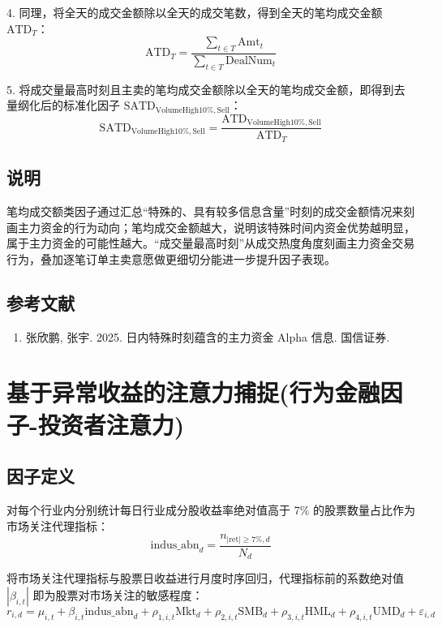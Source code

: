 \documentclass{article}
\begin{document}
4. 同理，将全天的成交金额除以全天的成交笔数，得到全天的笔均成交金额 \( \mathrm{ATD}_T \)：
\begin{equation}
    \mathrm{ATD}_T = \frac{\sum_{t \in T} \mathrm{Amt}_t}{\sum_{t \in T} \mathrm{DealNum}_t}
\end{equation}

5. 将成交量最高时刻且主卖的笔均成交金额除以全天的笔均成交金额，即得到去量纲化后的标准化因子 \( \mathrm{SATD}_{\mathrm{VolumeHigh10\%,Sell}} \)：
\begin{equation}
    \mathrm{SATD}_{\mathrm{VolumeHigh10\%,Sell}} = \frac{\mathrm{ATD}_{\mathrm{VolumeHigh10\%,Sell}}}{\mathrm{ATD}_T}
\end{equation}

\subsection{说明}
笔均成交额类因子通过汇总“特殊的、具有较多信息含量”时刻的成交金额情况来刻画主力资金的行为动向；笔均成交金额越大，说明该特殊时间内资金优势越明显，属于主力资金的可能性越大。“成交量最高时刻”从成交热度角度刻画主力资金交易行为，叠加逐笔订单主卖意愿做更细切分能进一步提升因子表现。

\subsection{参考文献}
\begin{enumerate}
    \item 张欣鹏, 张宇. 2025. 日内特殊时刻蕴含的主力资金 Alpha 信息. 国信证券.
\end{enumerate}

\section{基于异常收益的注意力捕捉(行为金融因子-投资者注意力)}

\subsection{因子定义}

对每个行业内分别统计每日行业成分股收益率绝对值高于 7\% 的股票数量占比作为市场关注代理指标：
\begin{equation}
    \mathrm{indus\_abn}_d = \frac{n_{|\mathrm{ret}| \geq 7\%, d}}{N_d}
\end{equation}

将市场关注代理指标与股票日收益进行月度时序回归，代理指标前的系数绝对值 \(|\beta_{i,t}|\) 即为股票对市场关注的敏感程度：
\begin{equation}
    r_{i,d} = \mu_{i,t} + \beta_{i,t} \mathrm{indus\_abn}_d + \rho_{1,i,t} \mathrm{Mkt}_d + \rho_{2,i,t} \mathrm{SMB}_d + \rho_{3,i,t} \mathrm{HML}_d + \rho_{4,i,t} \mathrm{UMD}_d + \varepsilon_{i,d}
\end{equation}
\end{document}
